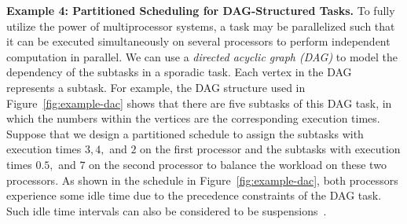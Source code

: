   
  


{\bf Example 4: Partitioned Scheduling for DAG-Structured Tasks.}
 \hspace{0.1in}
To fully utilize the power of multiprocessor systems, a task may be parallelized such that it can be executed simultaneously on several processors to perform independent computation in parallel. We can use a \emph{directed acyclic graph (DAG)} to model the dependency of the subtasks in a sporadic task. Each vertex in the DAG represents a subtask. For example, the DAG structure used in Figure~\ref{fig:example-dac} shows that there are five subtasks of this DAG task, in which the numbers within the vertices are the corresponding execution times. Suppose that we design a partitioned schedule to assign the subtasks with execution times $3,4,$ and $2$ on the first processor and the subtasks with execution times $0.5,$ and $7$ on the second processor to balance the workload on these two processors. As shown in the schedule in Figure~\ref{fig:example-dac}, both processors experience some idle time 
due to the precedence constraints of the DAG task. Such idle time intervals can also be considered to be suspensions~\cite{fonseca2016response}. 




